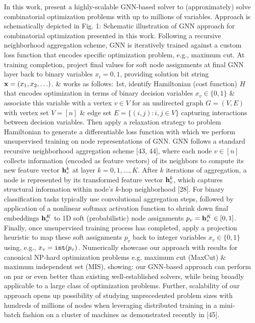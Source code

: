 \documentclass{article}
\begin{document}
\begin{itemize}
    In this work, present a highly-scalable GNN-based solver to (approximately) solve combinatorial optimization problems with up to millions of variables. Approach is schematically depicted in {\sf Fig. 1:  Schematic illustration of GNN approach for combinatorial optimization presented in this work. Following a recursive neighborhood aggregation scheme, GNN is iteratively trained against a custom loss function that encodes specific optimization problem, e.g., maximum cut. At training completion, project final values for soft node assignments at final GNN layer back to binary variables $x_i = 0,1$, providing solution bit string ${\bf x} = (x_1,x_2,\ldots)$.} \& works as follows: 1st, identify Hamiltonian (cost function) $H$ that encodes optimization in terms of binary decision variables $x_v\in\{0,1\}$ \& associate this variable with a vertex $v\in V$ for an undirected graph $G = (V,E)$ with vertex set $V = [n]$ \& edge set $E = \{(i,j):i,j\in V\}$ capturing interactions between decision variables. Then apply a relaxation strategy to problem Hamiltonian to generate a differentiable loss function with which we perform unsupervised training on node representations of GNN. GNN follows a standard recursive neighborhood aggregation scheme [43, 44], where each node $v\in[n]$ collects information (encoded as feature vectors) of its neighbors to compute its new feature vector ${\bf h}_v^k$ at layer $k = 0,1,\ldots,K$. After $k$ iterations of aggregation, a node is represented by its transformed feature vector ${\bf h}_v^k$, which captures structural information within node's $k$-hop neighborhood [28]. For binary classification tasks typically use convolutional aggregation steps, followed by application of a nonlinear softmax activation function to shrink down final embeddings ${\bf h}_v^K$ to 1D soft (probabilistic) node assignments $p_v = {\bf h}_v^K\in[0,1]$. Finally, once unsupervised training process has completed, apply a projection heuristic to map these soft assignments $p_v$ back to integer variables $x_v\in\{0,1\}$ using, e.g., $x_v = {\tt int}(p_v)$. Numerically showcase our approach with results for canonical NP-hard optimization problems e.g. maximum cut (MaxCut) \& maximum independent set (MIS), showing: our GNN-based approach can perform on par or even better than existing well-established solvers, while being broadly applicable to a large class of optimization problems. Further, scalability of our approach opens up possibility of studying unprecedented problem sizes with hundreds of millions of nodes when leveraging distributed training in a mini-batch fashion on a cluster of machines as demonstrated recently in [45].


\end{itemize}
\end{document}
